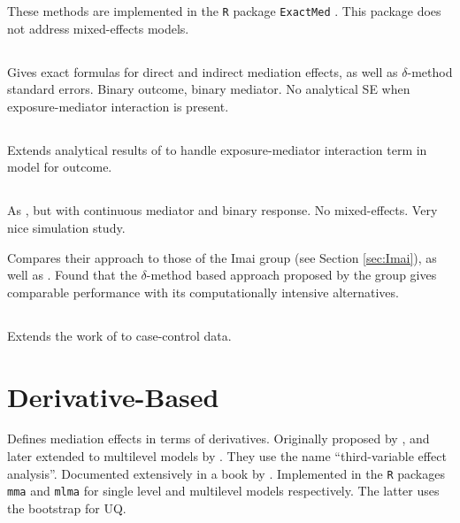 \documentclass{report}
\begin{document}
These methods are implemented in the \texttt{R} package \texttt{ExactMed} \citep{Cau23}. This package does not address mixed-effects models.


\subsection{\citet{Sam18}}

Gives exact formulas for direct and indirect mediation effects, as well as $\delta$-method standard errors. Binary outcome, binary mediator. No analytical SE when exposure-mediator interaction is present.

\subsection{\citet{Sam21}}

Extends analytical results of \citet{Sam18} to handle exposure-mediator interaction term in model for outcome.

\subsection{\citet{Sam23}}

As \citet{Sam18}, but with continuous mediator and binary response. No mixed-effects. Very nice simulation study.

Compares their approach to those of the Imai group (see Section \ref{sec:Imai}), as well as \citet{Lan12}. Found that the $\delta$-method based approach proposed by the \citeauthor{Sam23} group gives comparable performance with its computationally intensive alternatives.

\subsection{\citet{Cau24}}

Extends the work of \citet{Sam23} to case-control data.


\section{Derivative-Based}
\label{sec:deriv}

Defines mediation effects in terms of derivatives. Originally proposed by \citet{Yu14}, and later extended to multilevel models by \citet{Yu20}. They use the name ``third-variable effect analysis''. Documented extensively in a book by \citet{Yu22}. Implemented in the \texttt{R} packages \texttt{mma} and \texttt{mlma} for single level and multilevel models respectively. The latter uses the bootstrap for UQ.
\end{document}
